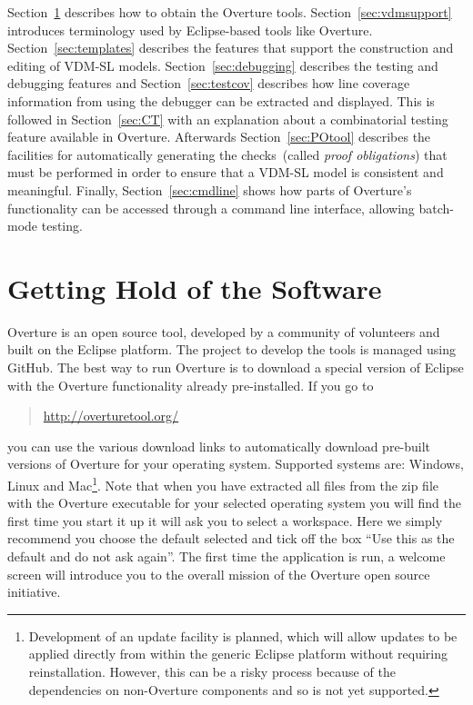 Section~\ref{sec:install} describes how to obtain the Overture tools.  Section~\ref{sec:vdmsupport} introduces terminology used by Eclipse-based tools like Overture. Section~\ref{sec:templates} describes the features that support the construction and editing of
VDM-SL models.  Section~\ref{sec:debugging} describes the testing and debugging features and Section~\ref{sec:testcov} describes how line coverage information from using the debugger can be extracted and displayed. This is followed in Section~\ref{sec:CT} with an explanation about a combinatorial testing feature available in Overture.  Afterwards Section~\ref{sec:POtool} describes the facilities for automatically generating the checks~(called \emph{proof obligations}) that must be performed in order to ensure that a VDM-SL model is consistent and
meaningful.  Finally, Section~\ref{sec:cmdline} shows how parts of Overture's functionality can be accessed through a command line interface, allowing batch-mode testing. 
%
\section{Getting Hold of the Software}\label{sec:install}
Overture is an open source tool, developed by a community of volunteers and built on the Eclipse platform.  The project to develop the tools is managed using GitHub.  The best way to run Overture is to download a special version of Eclipse with the Overture functionality already pre-installed. If you go to
%
\begin{quote}
\url{http://overturetool.org/}
\end{quote}
%
\noindent you can use the various download links to automatically download pre-built versions of Overture for your operating system.  Supported systems are: Windows, Linux and Mac\footnote{Development of an update facility is planned, which will allow updates to be applied directly from within the generic Eclipse platform without requiring reinstallation. However, this can be a risky process because of the dependencies on non-Overture components and so is not yet supported.}.  Note that when you have extracted all files from the zip file with the Overture executable for your selected operating system you will find the first time you start it up it will ask you to select a workspace. Here we simply recommend you choose the default selected and tick off the box ``Use this as the default and do not ask again''. The first time the application is run, a welcome screen will introduce you to the overall mission of the Overture open source
initiative. 

